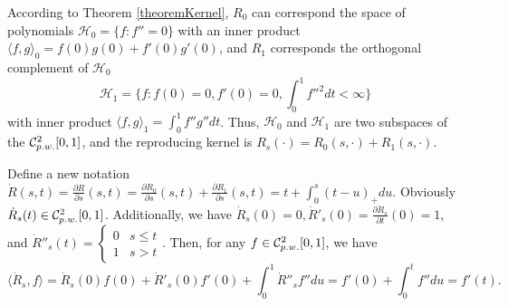 According to Theorem \ref{theoremKernel}, $R_0$ can correspond the space of polynomials $\mathcal{H}_0=\{f:f''=0\}$ with an inner product $\langle f,g \rangle_0= f(0)g(0)+f'(0)g'(0)$, and $R_1$ corresponds the orthogonal complement of $\mathcal{H}_0$
\begin{equation*}
\mathcal{H}_1=\{f:f(0)=0, f'(0)=0, \int_{0}^{1}f''^2dt<\infty\}
\end{equation*}
with inner product $\langle f,g \rangle_1=\int_{0}^{1}f''g''dt$. Thus, $\mathcal{H}_0$ and $\mathcal{H}_1$ are two subspaces of the $\mathcal{C}_{\footnotesize p.w.}^{2}[0,1]$, and the reproducing kernel is $R_s(\cdot) = R_0(s,\cdot)+R_1(s,\cdot)$.


Define a new notation $\dot{R}(s,t)=\frac{\partial R}{\partial s}(s,t)=\frac{\partial R_0}{\partial s}(s,t)+\frac{\partial R_1}{\partial s}(s,t)=t+\int_0^s(t-u)_+du$. Obviously $\dot{R}_s(t) \in \mathcal{C}_{\footnotesize p.w.}^{2}[0,1]$. Additionally, we have $\dot{R}_s(0)=0, \dot{R}'_s(0)=\frac{\partial \dot{R}_s}{\partial t}(0)=1$, and $ \dot{R}''_s(t)=\begin{cases}
0 & s\leq t \\ 1 & s>t \end{cases}$. Then, for any $f\in \mathcal{C}_{\footnotesize p.w.}^{2}[0,1]$, we have 
\begin{equation*}
\langle \dot{R}_s,f\rangle =\dot{R}_s(0)f(0)+\dot{R}'_s(0)f'(0)+\int_0^1\dot{R}''_s f''	 du=f'(0)+\int_0^t f''du=f'(t).
\end{equation*}
%
